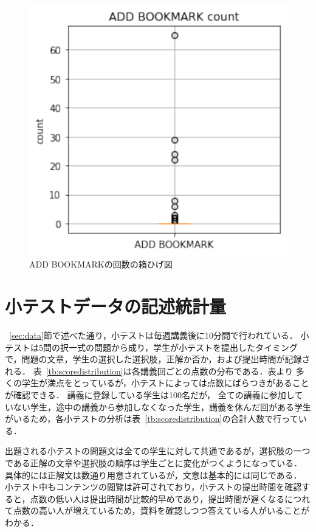 \documentclass[a4paper,12pt]{ltjsreport}
\begin{document}
\begin{figure}[tbp]
  \centering
  \includegraphics[scale = 0.7]{add_bookmark.pdf}
  \caption{ADD BOOKMARKの回数の箱ひげ図}
  \label{fig:addbookmark}
\end{figure}


\section{小テストデータの記述統計量}\label{sec:quiz}

~\ref{sec:data}節で述べた通り，小テストは毎週講義後に10分間で行われている．
小テストは5問の択一式の問題から成り，学生が小テストを提出したタイミングで，問題の文章，学生の選択した選択肢，正解か否か，および提出時間が記録される．
表~\ref{tb:scoredistribution}は各講義回ごとの点数の分布である．表より
多くの学生が満点をとっているが，小テストによっては点数にばらつきがあることが確認できる．
講義に登録している学生は100名だが，
全ての講義に参加していない学生，途中の講義から参加しなくなった学生，講義を休んだ回がある学生
がいるため，各小テストの分析は表~\ref{tb:scoredistribution}の合計人数で行っている．


出題される小テストの問題文は全ての学生に対して共通であるが，選択肢の一つである正解の文章や選択肢の順序は学生ごとに変化がつくようになっている．
具体的には正解文は数通り用意されているが，文意は基本的には同じである．
小テスト中もコンテンツの閲覧は許可されており，小テストの提出時間を確認すると，点数の低い人は提出時間が比較的早めであり，提出時間が遅くなるにつれて点数の高い人が増えているため，資料を確認しつつ答えている人がいることがわかる．
\end{document}
